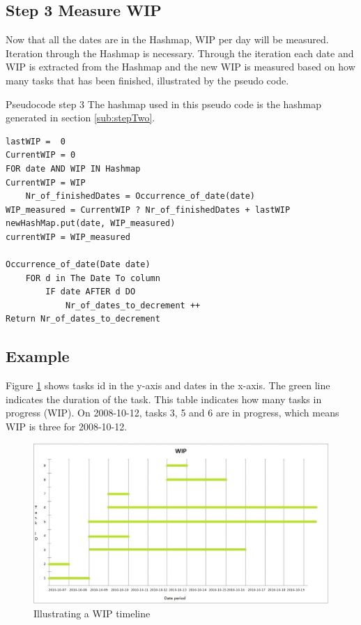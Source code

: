 \documentclass[UKenglish]{ifimaster}  %
\begin{document}
\subsection{Step 3 Measure WIP}
Now that all the dates are in the Hashmap, WIP per day will be measured. Iteration through the Hashmap is necessary. Through the iteration each date and WIP is extracted from the Hashmap and the new WIP is measured based on how many tasks that has been finished, illustrated by the pseudo code.

Pseudocode step 3
The hashmap used in this pseudo code is the hashmap generated in section \ref{sub:stepTwo}.

\begin{lstlisting}
lastWIP =  0
CurrentWIP = 0
FOR date AND WIP IN Hashmap	
CurrentWIP = WIP 
	Nr_of_finishedDates = Occurrence_of_date(date)  
WIP_measured = CurrentWIP ? Nr_of_finishedDates + lastWIP
newHashMap.put(date, WIP_measured)
currentWIP = WIP_measured 

Occurrence_of_date(Date date)
	FOR d in The Date To column
		IF date AFTER d DO
			Nr_of_dates_to_decrement ++
Return Nr_of_dates_to_decrement 
 \end{lstlisting}

\subsection{Example}
\label{sec:Example}
Figure \ref{wip_timeline}  shows tasks id in the y-axis and dates in the x-axis. The green line indicates the duration of the task. This table indicates how many tasks in progress (WIP). On 2008-10-12, tasks 3, 5 and 6 are in progress, which means WIP is three for 2008-10-12.  
\begin{figure}[ht!]
\centering
\includegraphics[width=150mm]{Picture/wip_example.jpg}
\caption{Illustrating a WIP timeline}
\label{wip_timeline}
\end{figure}
\end{document}
